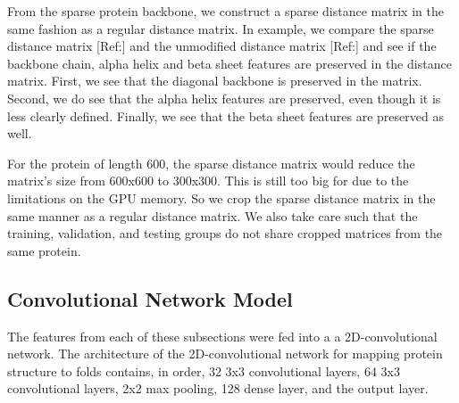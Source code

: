 \documentclass[12pt, a4paper, twocolumn, fullpage]{article}
\theoremstyle{plain}
\theoremstyle{definition}
\theoremstyle{remark}
\begin{document}
From the sparse protein backbone, we construct a sparse distance matrix in the same fashion as a regular distance matrix. In example, we compare the sparse distance matrix [Ref:] and the unmodified distance matrix [Ref:] and see if the backbone chain, alpha helix and beta sheet features are preserved in the distance matrix. First, we see that the diagonal backbone is preserved in the matrix. Second, we do see that the alpha helix features are preserved, even though it is less clearly defined. Finally, we see that the beta sheet features are preserved as well.

For the protein of length 600, the sparse distance matrix would reduce the matrix's size from 600x600 to 300x300. This is still too big for due to the limitations on the GPU memory. So we crop the sparse distance matrix in the same manner as a regular distance matrix. We also take care such that the training, validation, and testing groups do not share cropped matrices from the same protein.

\subsection{Convolutional Network Model}

The features from each of these subsections were fed into a a 2D-convolutional network. The architecture of the 2D-convolutional network for mapping protein structure to folds contains, in order, 32 3x3 convolutional layers, 64 3x3 convolutional layers, 2x2 max pooling, 128 dense layer, and the output layer.
\end{document}
